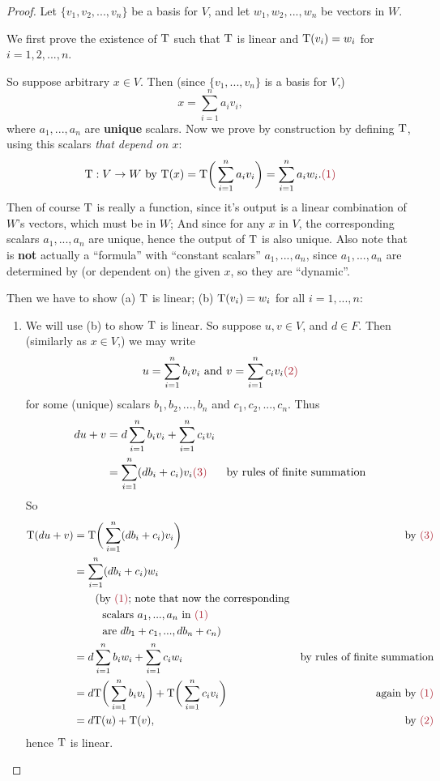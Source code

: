 \begin{proof}
Let \(\{ v_1, v_2, ..., v_n \}\) be a basis for \(V\), and let \(w_1, w_2, ..., w_n\) be vectors in \(W\).

We first prove the existence of \(\mathrm{T}\) such that \(\mathrm{T}\) is linear and \(\mathrm{T}(v_i) = w_i\) for \(i = 1, 2, ..., n\).

So suppose arbitrary \(x \in V\).
Then (since \(\{ v_1, ..., v_n \}\) is a basis for \(V\),)
\[
    x = \sum_{i = 1}^n a_i v_i,
\]
where \(a_1, ..., a_n\) are \textbf{unique} scalars.
Now we prove by construction by defining \(\mathrm{T}\), using this scalars \emph{that depend on \(x\)}:
\[
    \T : V \to W \text{ by } \T(x) = \T\bigg(\sum_{i = 1}^n a_i v_i\bigg) = \sum_{i = 1}^n a_i w_i. \MAROON{(1)}
\]
Then of course \(\mathrm{T}\) is really a function, since
 it's output is a linear combination of \(W\)'s vectors, which must be in \(W\);
 And since for any \(x\) in \(V\), the corresponding scalars \(a_1, ..., a_n\) are unique, hence the output of \(\mathrm{T}\) is also unique.
Also note that  is \textbf{not} actually a ``formula'' with ``constant scalars'' \(a_1, ..., a_n\), since \(a_1, ..., a_n\) are determined by (or dependent on) the given \(x\), so they are ``dynamic''.

Then we have to show (a) \(\mathrm{T}\) is linear; (b) \(\mathrm{T}(v_i) = w_i\) for all \(i = 1, ..., n\):
\begin{enumerate}
\item
We will use (b) to show \(\mathrm{T}\) is linear.
So suppose \(u, v \in V\), and \(d \in F\).
Then (similarly as \(x \in V\),) we may write
\[
    u = \sum_{i = 1}^n b_i v_i \text{ and } v = \sum_{i = 1}^n c_i v_i \MAROON{(2)}
\]
for some (unique) scalars \(b_1, b_2, ..., b_n\) and \(c_1, c_2, ..., c_n\).
Thus
\begin{align*}
    d u + v & = d \sum_{i = 1}^n b_i v_i + \sum_{i = 1}^n c_i v_i \\
            & = \sum_{i = 1}^n (db_i + c_i) v_i \MAROON{(3)} & \text{by rules of finite summation}
\end{align*}
So
\begin{align*}
    \T(du + v) & = \T\bigg( \sum_{i = 1}^n (db_i + c_i) v_i \bigg) & \text{by \MAROON{(3)}} \\
               & = \sum_{i = 1}^n (db_i + c_i) w_i \\
               & \text{\ \ \ \ \ \ (by \MAROON{(1)}; note that now the corresponding} \\
               & \text{\ \ \ \ \ \ \ \ scalars \(a_1, ..., a_n\) in \MAROON{(1)}} \\
               & \text{\ \ \ \ \ \ \ \ are \(d b_1 + c_1, ..., d b_n + c_n\))} \\
               & = d \sum_{i = 1}^n b_i w_i + \sum_{i = 1}^n c_i w_i & \text{by rules of finite summation} \\
               & = d \T\bigg( \sum_{i = 1}^n b_i v_i \bigg) + \T\bigg( \sum_{i = 1}^n c_i v_i \bigg) & \text{again by \MAROON{(1)}} \\
               & = d \T(u) + \T(v), & \text{by \MAROON{(2)}}
\end{align*}
hence \(\mathrm{T}\) is linear.


\end{enumerate}
\end{proof}
